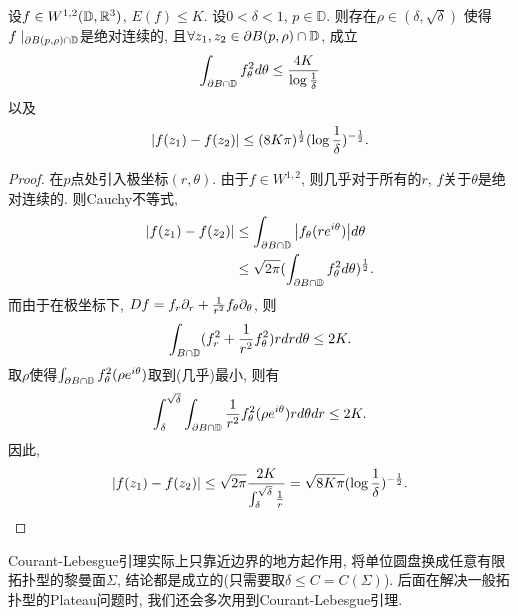 \begin{lemma} \label{courant_lebesgue}
    设$f \in W^{1,2}(\D,\R^3)$, $E(f) \le K$. 设$0 < \delta < 1$, $p \in \mathbb{D}$. 则存在$\rho \in (\delta, \sqrt{\delta})$ 使得$f\mid_{\P B(p,\rho) \cap \D}$是绝对连续的, 且$\forall z_1,z_2 \in \P B(p,\rho) \cap \D$, 成立 
    \begin{equation}
        \int_{\P B \cap \D} f_\theta^2 d\theta \le \frac{4K}{\log \rec{\delta}}
    \end{equation}
    以及
    \begin{equation}
        \abs{f(z_1)- f(z_2)} \le (8K\pi)^{\frac{1}{2}}(\log \frac{1}{\delta})^{-\frac{1}{2}}.
    \end{equation}
\end{lemma}
\begin{proof}
    在$p$点处引入极坐标$(r,\theta)$. 由于$f \in W^{1,2}$, 则几乎对于所有的$r$, $f$关于$\theta$是绝对连续的.  则Cauchy不等式, 
    \begin{equation}
        \begin{split}
            \abs{f(z_1)-f(z_2)} &\le \int_{\P B \cap \D} \abs{f_\theta(re^{i\theta})}d\theta \\
            & \le \sqrt{2\pi} (\int_{\P B\cap \D} f^2_\theta d\theta)^{\frac{1}{2}}.
        \end{split}
    \end{equation}
    而由于在极坐标下, $Df=f_r \P_r + \frac{1}{r^2}f_\theta \P_\theta$, 则
    \begin{equation}
        \int_{B \cap \D} (f_r^2 + \frac{1}{r^2}f_\theta^2)r drd\theta \le 2K.
    \end{equation}
    取$\rho$使得$\int_{\P B \cap \D} f^2_\theta(\rho e^{i\theta})$取到(几乎)最小, 则有
    \begin{equation}
        \int^{\sqrt{\delta}}_\delta \int_{\P B \cap \D}\frac{1}{r^2}f^2_\theta(\rho e^{i\theta}) rd\theta dr \le 2K.
    \end{equation}
    因此, 
    \begin{equation}
        \abs{f(z_1)-f(z_2)} \le \sqrt{2\pi} \frac{2K}{ \int^{\sqrt{\delta}}_\delta \frac{1}{r}} = \sqrt{8K\pi}(\log \frac{1}{\delta})^{-\frac{1}{2}}.
    \end{equation}
\end{proof}
\begin{remark}
    Courant-Lebesgue引理实际上只靠近边界的地方起作用, 将单位圆盘换成任意有限拓扑型的黎曼面$\Sigma$, 结论都是成立的(只需要取$\delta \le C=C(\Sigma)$). 后面在解决一般拓扑型的Plateau问题时, 我们还会多次用到Courant-Lebesgue引理.
\end{remark}
